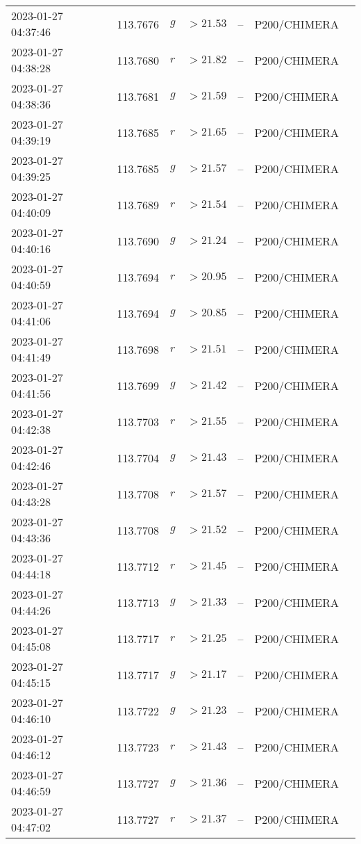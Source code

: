 \documentclass{nature_plusfigure}
\begin{document}
\begin{supplement}
\begin{center}
\begin{longtable}{lllllll}
2023-01-27 04:37:46 & 113.7676 & $g$ & $>21.53$ & -- & P200/CHIMERA &  \\ 
2023-01-27 04:38:28 & 113.7680 & $r$ & $>21.82$ & -- & P200/CHIMERA &  \\ 
2023-01-27 04:38:36 & 113.7681 & $g$ & $>21.59$ & -- & P200/CHIMERA &  \\ 
2023-01-27 04:39:19 & 113.7685 & $r$ & $>21.65$ & -- & P200/CHIMERA &  \\ 
2023-01-27 04:39:25 & 113.7685 & $g$ & $>21.57$ & -- & P200/CHIMERA &  \\ 
2023-01-27 04:40:09 & 113.7689 & $r$ & $>21.54$ & -- & P200/CHIMERA &  \\ 
2023-01-27 04:40:16 & 113.7690 & $g$ & $>21.24$ & -- & P200/CHIMERA &  \\ 
2023-01-27 04:40:59 & 113.7694 & $r$ & $>20.95$ & -- & P200/CHIMERA &  \\ 
2023-01-27 04:41:06 & 113.7694 & $g$ & $>20.85$ & -- & P200/CHIMERA &  \\ 
2023-01-27 04:41:49 & 113.7698 & $r$ & $>21.51$ & -- & P200/CHIMERA &  \\ 
2023-01-27 04:41:56 & 113.7699 & $g$ & $>21.42$ & -- & P200/CHIMERA &  \\ 
2023-01-27 04:42:38 & 113.7703 & $r$ & $>21.55$ & -- & P200/CHIMERA &  \\ 
2023-01-27 04:42:46 & 113.7704 & $g$ & $>21.43$ & -- & P200/CHIMERA &  \\ 
2023-01-27 04:43:28 & 113.7708 & $r$ & $>21.57$ & -- & P200/CHIMERA &  \\ 
2023-01-27 04:43:36 & 113.7708 & $g$ & $>21.52$ & -- & P200/CHIMERA &  \\ 
2023-01-27 04:44:18 & 113.7712 & $r$ & $>21.45$ & -- & P200/CHIMERA &  \\ 
2023-01-27 04:44:26 & 113.7713 & $g$ & $>21.33$ & -- & P200/CHIMERA &  \\ 
2023-01-27 04:45:08 & 113.7717 & $r$ & $>21.25$ & -- & P200/CHIMERA &  \\ 
2023-01-27 04:45:15 & 113.7717 & $g$ & $>21.17$ & -- & P200/CHIMERA &  \\ 
2023-01-27 04:46:10 & 113.7722 & $g$ & $>21.23$ & -- & P200/CHIMERA &  \\ 
2023-01-27 04:46:12 & 113.7723 & $r$ & $>21.43$ & -- & P200/CHIMERA &  \\ 
2023-01-27 04:46:59 & 113.7727 & $g$ & $>21.36$ & -- & P200/CHIMERA &  \\ 
2023-01-27 04:47:02 & 113.7727 & $r$ & $>21.37$ & -- & P200/CHIMERA &  \\ 

\end{longtable}
\end{center}
\end{supplement}
\end{document}
